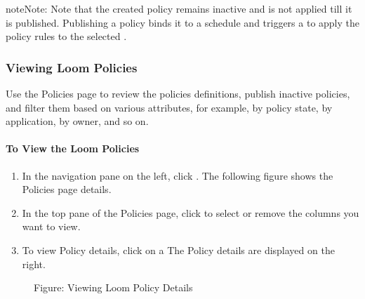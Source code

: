 \documentclass[letterpaper,10pt,english]{sphinxmanual}
\begin{document}
\begin{sphinxadmonition}{note}{Note:}
Note that the created policy remains inactive and is not applied till it is published. Publishing a policy binds it to a schedule and triggers a  to apply the policy rules to the selected .
\end{sphinxadmonition}


\subsubsection{Viewing Loom Policies}
\label{\detokenize{loom_getting_started_guide:viewing-loom-policies}}
Use the Policies page to review the policies definitions, publish inactive policies, and filter them based on various attributes, for example, by policy state, by application, by owner, and so on.


\paragraph{To View the Loom Policies}
\label{\detokenize{loom_getting_started_guide:to-view-the-loom-policies}}\begin{enumerate}
\item {} 
In the navigation pane on the left, click . The following figure shows the Policies page details.

\item {} 
In the top pane of the Policies page, click  to select or remove the columns you want to view.

\item {} 
To view Policy details, click on a  The Policy details are displayed on the right.

\end{enumerate}

\begin{figure}[htbp]
\centering
\capstart

\noindent{}
\caption{Figure: Viewing Loom Policy Details}\label{\detokenize{loom_getting_started_guide:id43}}\end{figure}
\end{document}
